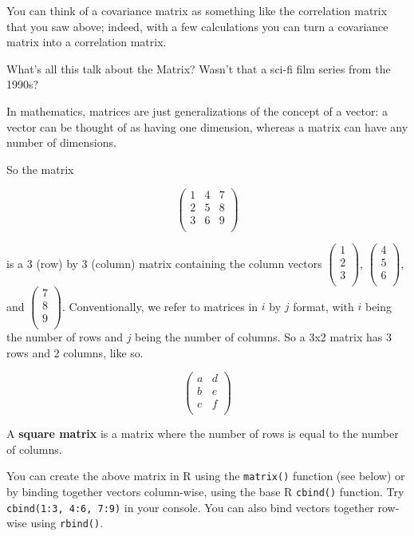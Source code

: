 \documentclass[]{book}
\begin{document}
You can think of a covariance matrix as something like the correlation matrix that you saw above; indeed, with a few calculations you can turn a covariance matrix into a correlation matrix.

What's all this talk about the Matrix? Wasn't that a sci-fi film series from the 1990s?

In mathematics, matrices are just generalizations of the concept of a vector: a vector can be thought of as having one dimension, whereas a matrix can have any number of dimensions.

So the matrix

\[
\begin{pmatrix}
1 & 4 & 7 \\
2 & 5 & 8 \\
3 & 6 & 9 \\
\end{pmatrix}
\]

is a 3 (row) by 3 (column) matrix containing the column vectors \(\begin{pmatrix} 1 \\ 2 \\ 3 \\ \end{pmatrix}\), \(\begin{pmatrix} 4 \\ 5 \\ 6 \\ \end{pmatrix}\), and \(\begin{pmatrix} 7 \\ 8 \\ 9 \\ \end{pmatrix}\). Conventionally, we refer to matrices in \(i\) by \(j\) format, with \(i\) being the number of rows and \(j\) being the number of columns. So a 3x2 matrix has 3 rows and 2 columns, like so.

\[
\begin{pmatrix}
a & d \\
b & e \\
c & f \\
\end{pmatrix}
\]

A \textbf{square matrix} is a matrix where the number of rows is equal to the number of columns.

You can create the above matrix in R using the \texttt{matrix()} function (see below) or by binding together vectors column-wise, using the base R \texttt{cbind()} function. Try \texttt{cbind(1:3,\ 4:6,\ 7:9)} in your console. You can also bind vectors together row-wise using \texttt{rbind()}.
\end{document}
